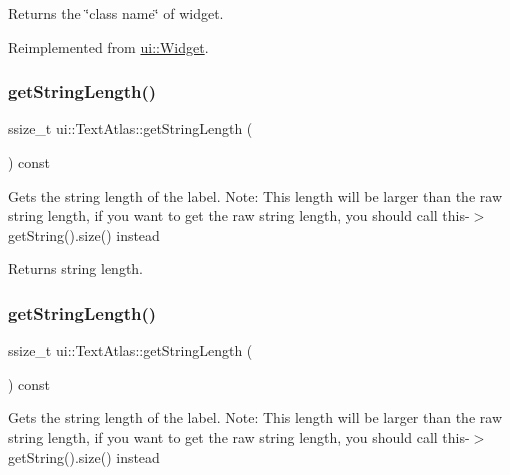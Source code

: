 Returns the \char`\"{}class name\char`\"{} of widget. 

Reimplemented from \hyperlink{classui_1_1Widget_ad85abdaa9133dc6b8efc32670ae9b93f}{ui\+::\+Widget}.

\mbox{\label{classui_1_1TextAtlas_abb16bab18d7e725fd0be9662a76d7e41}} 
\subsubsection{\texorpdfstring{get\+String\+Length()}{getStringLength()}\hspace{0.1cm}{\footnotesize\ttfamily [1/2]}}
{\footnotesize\ttfamily ssize\+\_\+t ui\+::\+Text\+Atlas\+::get\+String\+Length (\begin{DoxyParamCaption}{ }\end{DoxyParamCaption}) const}

Gets the string length of the label. Note\+: This length will be larger than the raw string length, if you want to get the raw string length, you should call this-\/$>$get\+String().size() instead

\begin{DoxyReturn}{Returns}
string length. 
\end{DoxyReturn}
\mbox{\label{classui_1_1TextAtlas_abb16bab18d7e725fd0be9662a76d7e41}} 
\subsubsection{\texorpdfstring{get\+String\+Length()}{getStringLength()}\hspace{0.1cm}{\footnotesize\ttfamily [2/2]}}
{\footnotesize\ttfamily ssize\+\_\+t ui\+::\+Text\+Atlas\+::get\+String\+Length (\begin{DoxyParamCaption}{ }\end{DoxyParamCaption}) const}

Gets the string length of the label. Note\+: This length will be larger than the raw string length, if you want to get the raw string length, you should call this-\/$>$get\+String().size() instead

